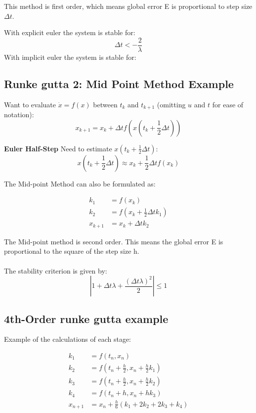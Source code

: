 This method is first order, which means global error E is proportional to step size $\Delta t$. 

With explicit euler the system is stable for: \[\Delta t < - \frac{2}{\lambda}\]
With implicit euler the system is stable for: $$

\subsection{Runke gutta 2: Mid Point Method Example }

Want to evaluate \(\dot{x} = f(x)\) between \(t_k\) and \(t_{k+1}\) (omitting \(u\) and \(t\) for ease of notation):
\begin{equation}
x_{k+1} = x_k + \Delta t f\left( x \left( t_k + \frac{1}{2} \Delta t \right) \right)
\end{equation}

\textbf{Euler Half-Step}
Need to estimate \(x \left( t_k + \frac{1}{2} \Delta t \right)\):
\begin{equation}
x \left( t_k + \frac{1}{2} \Delta t \right) \approx x_k + \frac{1}{2} \Delta t f(x_k)
\end{equation}

The Mid-point Method can also be formulated as:

\begin{align}
k_1 &= f(x_k) \\
k_2 &= f\left(x_k + \frac{1}{2} \Delta t k_1\right) \\
x_{k+1} &= x_k + \Delta t k_2
\end{align}

The Mid-point method is second order.  This means the global error E is proportional to the square of the step size h.
\\
\\
The stability criterion is given by:
\begin{equation}
\left| 1 + \Delta t \lambda + \frac{(\Delta t \lambda)^2}{2} \right| \leq 1
\end{equation}

\subsection{4th-Order runke gutta example}

Example of the calculations of each stage:

\begin{align}
k_1 &= f(t_n, x_n) \\
k_2 &= f\left(t_n + \frac{h}{2}, x_n + \frac{h}{2} k_1\right) \\
k_3 &= f\left(t_n + \frac{h}{2}, x_n + \frac{h}{2} k_2\right) \\
k_4 &= f(t_n + h, x_n + h k_3) \\
x_{n+1} &= x_n + \frac{h}{6} \left( k_1 + 2k_2 + 2k_3 + k_4 \right)
\end{align}

